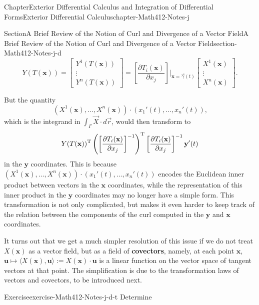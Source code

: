 \documentclass[oneside,10pt,]{book}
\newcommand{\terminology}[1]{\textbf{#1}}
\numberwithin{equation}{section}
\newcommand{\bx}{\mathbf{x}}
\newcommand{\by}{\mathbf{y}}
\begin{document}
\begin{chapterptx}{Chapter}{Exterior Differential Calculus and Integration of Differential Forms}{}{Exterior Differential Calculus}{}{}{chapter-Math412-Notes-j}
\begin{sectionptx}{Section}{A Brief Review of the Notion of Curl and Divergence of a Vector Field}{}{A Brief Review of the Notion of Curl and Divergence of a Vector Field}{}{}{section-Math412-Notes-j-d}
\begin{equation*}
Y(T({\mathbf x}))=\begin{bmatrix} Y^{1}(T({\mathbf x}))\\ \vdots \\ Y^{n}(T({\mathbf x}))\end{bmatrix}
= \left[\frac{\partial T_{i} ({\mathbf x})}{\partial x_{j}}\right]\left.\right|_{{\mathbf x}=\vec{\gamma}(t)}
\begin{bmatrix} X^{1}({\mathbf x}) \\ \vdots \\ X^{n}({\mathbf x})\end{bmatrix}.
\end{equation*}
%
\par
But the quantity%
\begin{equation*}
(X^{1}({\mathbf x}), \ldots , X^{n}({\mathbf x}))\cdot 
(x_{1}'(t),\ldots, x_{n}'(t))\text{,}
\end{equation*}
which is the integrand in \(\int_{\Gamma} \vec{X}\cdot d \vec{r}\), would then transform to%
\begin{equation*}
Y(T({\mathbf x}))^{\rm T}\left( \left[\frac{\partial T_{i} ({\mathbf x})}{\partial x_{j}}\right]^{-1}\right)^{\rm T}
\left[\frac{\partial T_{i} ({\mathbf x})}{\partial x_{j}}\right]^{-1} {\mathbf y}'(t)
\end{equation*}
in the \(\by\) coordinates. This is because \((X^{1}({\mathbf x}), \ldots , X^{n}({\mathbf x}))\cdot 
(x_{1}'(t),\ldots, x_{n}'(t))\) encodes the Euclidean inner product between vectors in the \(\bx\) coordinates, while the representation of this inner product in the \(\by\) coordinates may no longer have a simple form. This transformation is not only complicated, but makes it even harder to keep track of the relation between the components of the curl computed in the \(\mathbf y\) and \(\mathbf x\) coordinates.%
\par
It turns out that we get a much simpler resolution of this issue if we do not treat \(X(\mathbf x)\) as a vector field, but as a field of \terminology{covectors}, namely, at each point \(\mathbf x\), \(\mathbf u \mapsto \langle X(\mathbf x),  \mathbf u\rangle :=X(\mathbf x)\cdot \mathbf u\) is a linear function on the vector space of tangent vectors at that point. The simplification  is due to the transformation laws of vectors and covectors, to be introduced next.%
\begin{inlineexercise}{Exercise}{}{exercise-Math412-Notes-j-d-t}%
Determine%
\begin{equation*}

\end{equation*}
\end{inlineexercise}
\end{sectionptx}
\end{chapterptx}
\end{document}
